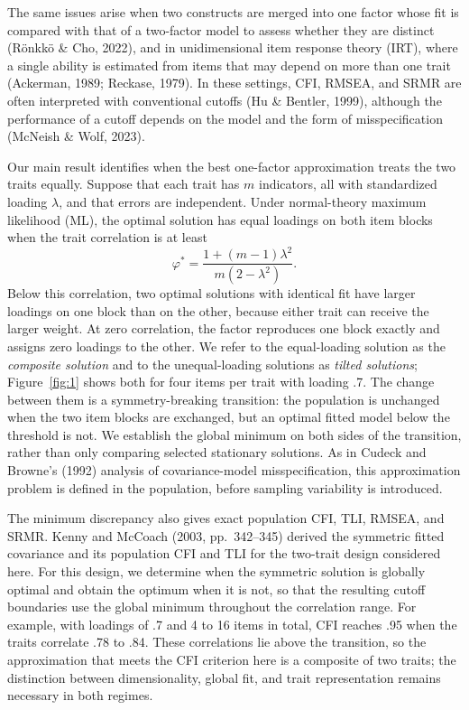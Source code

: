 The same issues arise when two constructs are merged into one factor whose fit is compared with that of a two-factor model to assess whether they are distinct (R\"onkk\"o \& Cho, 2022), and in unidimensional item response theory (IRT), where a single ability is estimated from items that may depend on more than one trait (Ackerman, 1989; Reckase, 1979). In these settings, CFI, RMSEA, and SRMR are often interpreted with conventional cutoffs (Hu \& Bentler, 1999), although the performance of a cutoff depends on the model and the form of misspecification (McNeish \& Wolf, 2023).

Our main result identifies when the best one-factor approximation treats the two traits equally. Suppose that each trait has $m$ indicators, all with standardized loading $\lambda$, and that errors are independent. Under normal-theory maximum likelihood (ML), the optimal solution has equal loadings on both item blocks when the trait correlation is at least
\[
\varphi^*=\frac{1+(m-1)\lambda^2}{m(2-\lambda^2)}.
\]
Below this correlation, two optimal solutions with identical fit have larger loadings on one block than on the other, because either trait can receive the larger weight. At zero correlation, the factor reproduces one block exactly and assigns zero loadings to the other. We refer to the equal-loading solution as the \emph{composite solution} and to the unequal-loading solutions as \emph{tilted solutions}; Figure~\ref{fig:1} shows both for four items per trait with loading .7. The change between them is a symmetry-breaking transition: the population is unchanged when the two item blocks are exchanged, but an optimal fitted model below the threshold is not. We establish the global minimum on both sides of the transition, rather than only comparing selected stationary solutions. As in Cudeck and Browne's (1992) analysis of covariance-model misspecification, this approximation problem is defined in the population, before sampling variability is introduced.

The minimum discrepancy also gives exact population CFI, TLI, RMSEA, and SRMR. Kenny and McCoach (2003, pp.~342--345) derived the symmetric fitted covariance and its population CFI and TLI for the two-trait design considered here. For this design, we determine when the symmetric solution is globally optimal and obtain the optimum when it is not, so that the resulting cutoff boundaries use the global minimum throughout the correlation range. For example, with loadings of .7 and 4 to 16 items in total, CFI reaches .95 when the traits correlate .78 to .84. These correlations lie above the transition, so the approximation that meets the CFI criterion here is a composite of two traits; the distinction between dimensionality, global fit, and trait representation remains necessary in both regimes.

